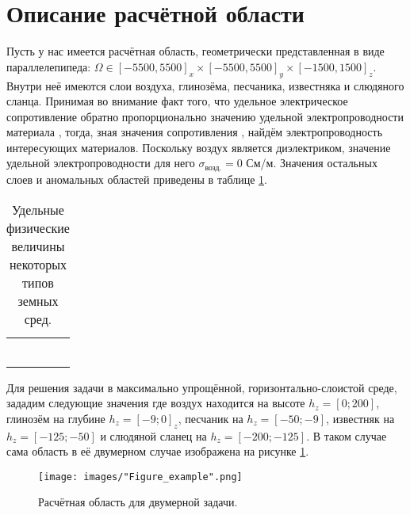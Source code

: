 \section{Описание расчётной области}

Пусть у нас имеется расчётная область, геометрически представленная в виде параллелепипеда: $\Omega \in [-5500, 5500]_x \times [-5500, 5500]_y \times [-1500, 1500]_z$. Внутри неё имеются слои воздуха, глинозёма, песчаника, известняка и слюдяного сланца. Принимая во внимание факт того, что удельное электрическое сопротивление обратно пропорционально значению удельной электропроводности материала \cite{3}, тогда, зная значения сопротивления \cite{4}, найдём электропроводность интересующих материалов. Поскольку воздух является диэлектриком, значение удельной электропроводности для него $\sigma_{\text{возд.}} = 0$ См/м. Значения остальных слоев и аномальных областей \cite{5} приведены в таблице \ref{tab:fields}.

\begin{table}
	\caption{Удельные физические величины некоторых типов земных сред.}
	\centering
	\small
	\begin{tabularx}{1.0\textwidth}{| >{\raggedright\arraybackslash}X | >{\raggedright\arraybackslash}X | >{\raggedright\arraybackslash}X |}
		\hline
		\centering{Земная порода} & \centering{Удельное электрическое сопротивление Ом $\cdot$ м} & \centering{Удельная электропроводимость См / м}  \tabularnewline \hline
		
		\centering{Глинозём} & \centering{125}& \centering{0.008} \tabularnewline \hline
		
		\centering{Песчаник} & \centering{2000} & \centering{0.0005} \tabularnewline \hline
		
		\centering{Юрский известняк} & \centering{40} & \centering{0.025} \tabularnewline \hline
		
		\centering{Слюдяной сланец} & \centering{800} & \centering{0.00125} \tabularnewline \hline
		
		\centering{Осадочная порода} & \centering{0.1} &\centering{10} \tabularnewline \hline
		
		\centering{Грунтовые воды} & \centering{0.25} & \centering{4} \tabularnewline \hline
		
	\end{tabularx}
	\label{tab:fields}
\end{table}

Для решения задачи в максимально упрощённой, горизонтально-слоистой среде, зададим следующие значения где воздух находится на высоте $h_z = [0; 200]$, глинозём на глубине $h_z = [-9; 0]_z$, песчаник на $h_z = [-50; -9]$, известняк на $h_z = [-125; -50]$ и слюдяной сланец на $h_z = [-200; -125]$. В таком случае сама область в её двумерном случае изображена на рисунке \ref{fig:example}.

\begin{figure}
	\centering
	\texttt{[image: images/"Figure\_example".png]}
	\caption{Расчётная область для двумерной задачи.}
	\label{fig:example}
\end{figure}